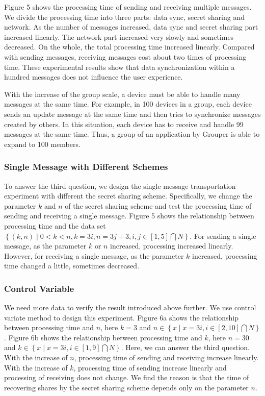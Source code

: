 \documentclass[twocolumn,10pt]{article}
\begin{document}
Figure 5 shows the processing time of sending and receiving multiple messages.
We divide the processing time into three parts: data sync, secret sharing and network.
As the number of messages increased, data sync and secret sharing part increased linearly. 
The network part increased very slowly and sometimes decreased.
On the whole, the total processing time increased linearly.
Compared with sending messages, receiving messages cost about two times of processing time.
These experimental results show that data synchronization within a hundred messages does not influence the user experience.

With the increase of the group scale, a device must be able to handle many messages at the same time.
For example, in 100 devices in a group, each device sends an update message at the same time and then tries to synchronize messages created by others.
In this situation, each device has to receive and handle 99 messages at the same time.
Thus, a group of an application by Grouper is able to expand to 100 members.

\subsubsection{Single Message with Different Schemes}

To answer the third question, we design the single message transportation experiment with different the secret sharing scheme.
Specifically, we change the parameter ${k}$  and ${n}$ of the secret sharing scheme and test the processing time of sending and receiving a single message.
Figure 5 shows the relationship between processing time and the data set ${\left \{ \left (k, n \right )\mid 0< k < n, k=3i, n=3j+3, i, j\in\left [ 1,5 \right ]\bigcap N\right \}}$.
For sending a single message, as the parameter ${k}$ or ${n}$ increased, processing increased linearly.
However, for receiving a single message, as the parameter ${k}$ increased, processing time  changed a little, sometimes decreased.

\subsubsection{Control Variable}

We need more data to verify the result introduced above further. 
We use control variate method to design this experiment.
Figure 6a shows the relationship between processing time and ${n}$, here ${k=3}$ and ${n \in \left \{ x\mid x=3i, i \in \left [ 2, 10 \right ] \bigcap N \right \}}$. 
Figure 6b shows the relationship between processing time and ${k}$, here ${n=30}$ and ${k \in \left \{ x\mid x=3i, i \in \left [ 1, 9 \right ] \bigcap N \right \}}$. 
Here, we can answer the third question.
With the increase of ${n}$, processing time of sending and receiving increase linearly.
With the increase of ${k}$, processing time of sending increase linearly and processing of receiving does not change.
We find the reason is that the time of recovering shares by the secret sharing scheme depends only on the parameter ${n}$.
\end{document}
